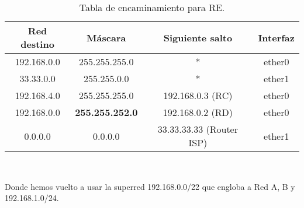\begin{ejercicio}
    \begin{table}[H]
        \centering
        \begin{tabular}{|c|c|c|c|}
            \hline
            Red destino & Máscara & Siguiente salto & Interfaz \\
            \hline
            192.168.0.0 & 255.255.255.0 & * & ether0 \\
            \hline
            33.33.0.0 & 255.255.0.0 & * & ether1 \\
            \hline
            192.168.4.0 & 255.255.255.0 & 192.168.0.3 (RC) & ether0 \\
            \hline
            192.168.0.0 & \textbf{255.255.252.0} & 192.168.0.2 (RD) & ether0 \\
            \hline
            0.0.0.0 & 0.0.0.0 & 33.33.33.33 (Router ISP) & ether1 \\
            \hline
        \end{tabular}\\
        \caption{Tabla de encaminamiento para RE.}
    \end{table}
    Donde hemos vuelto a usar la superred 192.168.0.0/22 que engloba a Red A, B y 192.168.1.0/24.
\end{ejercicio}

